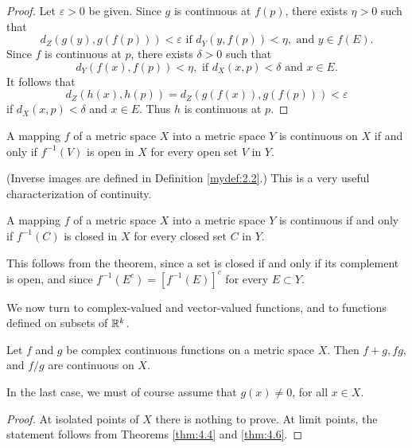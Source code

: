 \begin{proof}
    Let $\varepsilon > 0$ be given. Since $g$ is continuous at $f(p)$, there exists $\eta > 0$ such that 
    \begin{equation*}
        d_Z(g(y), g(f(p))) < \varepsilon \text{ if } d_Y(y,f(p)) < \eta, \text{ and } y \in f(E).
    \end{equation*}
Since $f$ is continuous at $p$, there exists $\delta > 0$ such that
\begin{equation*}
    d_Y(f(x),f(p)) < \eta, \text{ if } d_X(x, p) <\delta \text{ and } x \in E.
\end{equation*}
It follows that
\begin{equation*}
    d_Z(h(x), h(p)) = d_Z(g(f(x)), g(f(p))) < \varepsilon
\end{equation*}
if $d_X(x, p) < \delta$ and $x \in E$. Thus $h$ is continuous at $p$.
\end{proof}

\begin{thm}
    \label{thm:4.8}
    A mapping $f$ of a metric space $X$ into a metric space $Y$ is continuous on $X$ if and only if $f^{-1}(V)$ is open in $X$ for every open set $V$ in $Y$.
\end{thm}

(Inverse images are defined in Definition \ref{mydef:2.2}.) 
This is a very useful characterization of continuity.

\begin{myCorollary*}
    A mapping $f$ of a metric space $X$ into a metric space $Y$ is continuous if and only if $f^{-1} (C)$ is closed in $X$ for every closed set $C$ in $Y$.
\end{myCorollary*}

This follows from the theorem, since a set is closed if and only if its complement is open, and since $f^{-1}(E^c) = [f^{-1}(E)]^c$ for every $E \subset Y$.

We now turn to complex-valued and vector-valued functions, and to
functions defined on subsets of ${\protect\mathbb R}^{k}$.

\begin{thm}
    \label{thm:4.9}
    Let $f$ and $g$ be complex continuous functions on a metric space $X$.
    Then $f + g,fg$, and $f/g$ are continuous on $X$.
    
    In the last case, we must of course assume that $g(x) \neq 0$, for all $x \in  X$.
\end{thm}
\begin{proof}
    At isolated points of $X$ there is nothing to prove. At limit points,
    the statement follows from Theorems \ref{thm:4.4} and \ref{thm:4.6}.
\end{proof}

